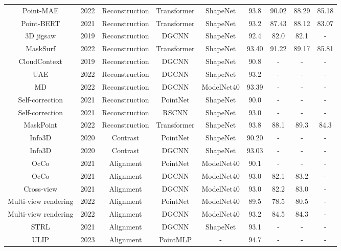 \documentclass[a4paper,fleqn]{cas-dc}
\begin{document}
\begin{table}[]
{\begin{tabular}{*{9}{c}}
        Point-MAE \citep{pang2022masked} & 2022 & Reconstruction & Transformer & ShapeNet & 93.8 & 90.02 & 88.29 & 85.18 \\ 
        Point-BERT \citep{yu2021point} & 2021 & Reconstruction & Transformer & ShapeNet & 93.2 & 87.43 & 88.12 & 83.07 \\ 
        3D jigsaw \citep{sauder2019self} & 2019 & Reconstruction & DGCNN & ShapeNet & 92.4 & 82.0 & 82.1 & - \\
        MaskSurf \citep{zhang2022masked} & 2022 & Reconstruction & Transformer & ShapeNet & 93.40 & 91.22 & 89.17 & 85.81 \\ 
        CloudContext \citep{sauder2019context} & 2019 & Reconstruction & DGCNN & ShapeNet & 90.8 & - & - & - \\
        UAE \citep{zhang2022upsampling} & 2022 & Reconstruction & DGCNN & ShapeNet & 93.2 & - & - & - \\
        MD \citep{sun2022self} & 2022 & Reconstruction & DGCNN & ModelNet40 & 93.39 & - & - & - \\
        Self-correction \citep{chen2021shape} & 2021 & Reconstruction & PointNet & ShapeNet & 90.0 & - & - & - \\
        Self-correction \citep{chen2021shape} & 2021 & Reconstruction & RSCNN & ShapeNet & 93.0 & - & - & - \\
        MaskPoint \citep{liu2022masked} & 2022 & Reconstruction & Transformer & ShapeNet & 93.8 & 88.1 & 89.3 & 84.3 \\
        \midrule
        Info3D \citep{sanghi2020info3d} & 2020 & Contrast & PointNet & ShapeNet & 90.20 & - & - & - \\
        Info3D \citep{sanghi2020info3d} & 2020 & Contrast & DGCNN & ShapeNet & 93.03 & - & - & - \\
        \midrule
        OcCo \citep{wang2021unsupervised} & 2021 & Alignment & PointNet & ModelNet40 & 90.1 & - & - & - \\
        OcCo \citep{wang2021unsupervised} & 2021 & Alignment & DGCNN & ModelNet40 & 93.0 & 82.1 & 83.2 & - \\
        Cross-view \citep{jing2021self} & 2021 & Alignment & DGCNN & ModelNet40 & 93.0 & 82.2 & 83.0 & - \\
        Multi-view rendering \citep{tran2022self} & 2022 & Alignment & PointNet & ModelNet40 & 89.5 & 78.5 & 80.5 & - \\
        Multi-view rendering \citep{tran2022self} & 2022 & Alignment & DGCNN & ModelNet40 & 93.2 & 84.5 & 84.3 & - \\
        STRL \citep{huang2021spatio} & 2021 & Alignment & DGCNN & ShapeNet & 93.1 & - & - & - \\
        ULIP \citep{xue2023ulip} & 2023 & Alignment & PointMLP & - & 94.7 & - & - & - \\
        \bottomrule
    \end{tabular}}
\end{table}
\end{document}
